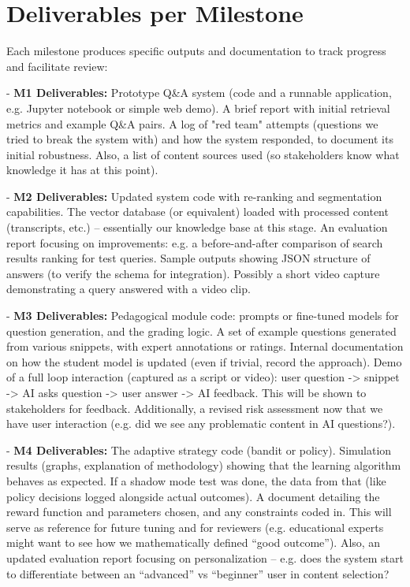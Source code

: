 \documentclass[11pt]{article}
\begin{document}
\section{Deliverables per Milestone}
Each milestone produces specific outputs and documentation to track progress and facilitate review:

- \textbf{M1 Deliverables:} Prototype Q\&A system (code and a runnable application, e.g. Jupyter notebook or simple web demo). A brief report with initial retrieval metrics and example Q\&A pairs. A log of "red team" attempts (questions we tried to break the system with) and how the system responded, to document its initial robustness. Also, a list of content sources used (so stakeholders know what knowledge it has at this point).

- \textbf{M2 Deliverables:} Updated system code with re-ranking and segmentation capabilities. The vector database (or equivalent) loaded with processed content (transcripts, etc.) – essentially our knowledge base at this stage. An evaluation report focusing on improvements: e.g. a before-and-after comparison of search results ranking for test queries. Sample outputs showing JSON structure of answers (to verify the schema for integration). Possibly a short video capture demonstrating a query answered with a video clip.

- \textbf{M3 Deliverables:} Pedagogical module code: prompts or fine-tuned models for question generation, and the grading logic. A set of example questions generated from various snippets, with expert annotations or ratings. Internal documentation on how the student model is updated (even if trivial, record the approach). Demo of a full loop interaction (captured as a script or video): user question -> snippet -> AI asks question -> user answer -> AI feedback. This will be shown to stakeholders for feedback. Additionally, a revised risk assessment now that we have user interaction (e.g. did we see any problematic content in AI questions?).

- \textbf{M4 Deliverables:} The adaptive strategy code (bandit or policy). Simulation results (graphs, explanation of methodology) showing that the learning algorithm behaves as expected. If a shadow mode test was done, the data from that (like policy decisions logged alongside actual outcomes). A document detailing the reward function and parameters chosen, and any constraints coded in. This will serve as reference for future tuning and for reviewers (e.g. educational experts might want to see how we mathematically defined “good outcome”). Also, an updated evaluation report focusing on personalization – e.g. does the system start to differentiate between an “advanced” vs “beginner” user in content selection?
\end{document}
